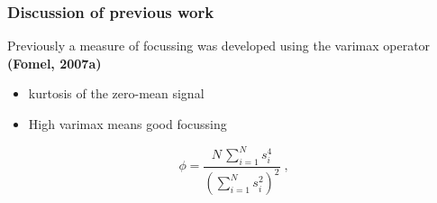 \begin{frame}
   \begin{multicols}{2}
      {}
      {}
   \end{multicols}

\end{frame}
\begin{frame}
   \begin{multicols}{2}
      {}
      {}
   \end{multicols}

	
\end{frame}
\begin{frame} 
 
\end{frame}



\begin{frame} \frametitle{Discussion of previous work}
Previously a measure of focussing was developed using the varimax operator \textbf{(Fomel, 2007a)}

\begin{itemize}
   \item kurtosis of the zero-mean signal
   \item High varimax means good focussing 
\end{itemize}
\begin{equation}
  \label{eq:focus} \phi = \frac{\displaystyle N\,\sum_{i=1}^N
  s_i^4}{\displaystyle \left(\sum_{i=1}^{N} s_i^2\right)^2}\;,
\end{equation}

\end{frame}
\cwpnote{}


